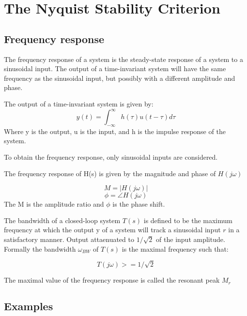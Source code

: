 \section{The Nyquist Stability Criterion}

\subsection{Frequency response}
The frequency response of a system is the steady-state response of a system to a sinusoidal input.
The output of a time-invariant system will have the same frequency as the sinusoidal input,
but possibly with a different amplitude and phase.

The output of a time-invariant system is given by:
$$y(t) = \int_{-\infty}^{\infty} h(\tau)u(t-\tau)d\tau$$
Where y is the output, u  is the input, and h is the impulse response of the system.

To obtain the frequency response, only sinusoidal inputs are considered.

The frequency response of H(s) is given by the magnitude and phase of $H(j\omega)$

$$M = |H(j\omega)|$$
$$\phi = \angle H(j\omega)$$
The M is the amplitude ratio and $\phi$ is the phase shift.

The bandwidth of a closed-loop system $T(s)$ is defined to be the maximum frequency at which
the output y of a system will track a sinusoidal input $r$ in a satisfactory manner. Output attaenuated to $1/\sqrt{2}$ of the input amplitude.
Formally the bandwidth $\omega_{BW}$ of $T(s)$ is the maximal frequency such that:

$$T(j\omega) >= 1/\sqrt{2}$$

The maximal value of the frequency response is called the resonant peak  $M_r$


\subsection{Examples}
